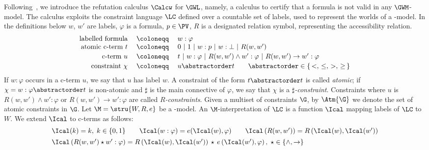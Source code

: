 Following~\cite{BilkovaFK:22,FerFioRod:2025}, we introduce the
refutation calculus $\Calcw$ for $\GWL$, namely, a calculus to certify
that a formula is not valid in any $\GWM$-model.  The calculus
exploits the constraint language $\LC$ defined over a countable set
of labels, used to represent the worlds of a \GWM-model.  In the
 definitions  below $w$, $w'$ are labels, $\varphi$  is a
formula, $p\in \PV$, $R$ is a designated relation symbol, representing
the accessibility relation.
\[
\begin{array}{rcl}
  \mbox{labelled formula} & \;\coloneqq&\; w :\varphi                            
  \\
  \mbox{atomic c-term $t$}  &\; \coloneqq&\; 0~|~1~|~w :p~|~w :\bot~|~R(w,w')
  \\[.5ex]
  \mbox{c-term $u$}  & \;\coloneqq&\; t~|~w : \varphi~|~R(w,w')\land w':\varphi~|~R(w,w')\to w':\varphi
  \\[.5ex]
  \mbox{constraint $\chi$}   &\; \coloneqq&\; u \abstractorder t \qquad \abstractorder\in \{\,<,\,\leq,\,>,\,\geq\,\}
\end{array}
\]
If  $w:\varphi$ occurs in   a c-term $u$, we say  that $u$ has label $w$.
A constraint of the form $t \abstractorder t$ is called \emph{atomic};
if $\chi= w:\varphi \abstractorder t$ is non-atomic and $\sharp$ is
the main connective of $\varphi$, we say that $\chi$ is a
\emph{$\sharp$-constraint}.
Constraints where $u$ is   $R(w,w')\land w':\varphi$ or
$R(w,w')\to w':\varphi$ are called
\emph{$R$-constraints}.
Given a multiset of constraints $\G$, by
$\Atm{\G}$ we denote the set of atomic constraints in $\G$.
Let $\M=\stru{W,R,e}$ be a \GWM-model. An $\M$-interpretation of
$\LC$ is a function $\Ical$ mapping labels of $\LC$ to $W$.
We extend $\Ical$ to c-terms as follows:
\[
  \begin{array}{l}
    \Ical(k) = k,\;k\in\{0,1\}
    \qquad
    \Ical( w:\varphi) = e(\Ical(w), \varphi)
    \qquad
    \Ical\left(R(w,w')\right) =  R\left(\Ical(w),\Ical(w')\right)
    \\[1ex]
    \Ical\left(R(w,w') \star w':\varphi\right) =
   R\left(\Ical(w),\Ical(w')\right) \,\star\, e\left(\Ical(w'),\varphi\right),\;\star\in\{\land, \to\}
  \end{array}
\]  
